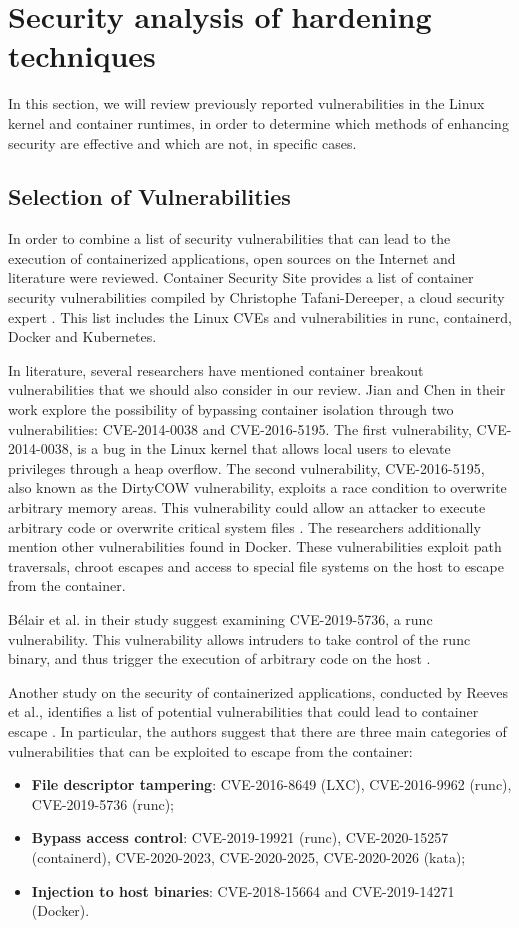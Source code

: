 \section{Security analysis of hardening techniques}

In this section, we will review previously reported vulnerabilities in the Linux kernel and container runtimes, in order to determine which methods of enhancing security are effective and which are not, in specific cases.

\subsection{Selection of Vulnerabilities}
In order to combine a list of security vulnerabilities that can lead to the execution of containerized applications, open sources on the Internet and literature were reviewed. Container Security Site provides a list of container security vulnerabilities compiled by Christophe Tafani-Dereeper, a cloud security expert \cite{s:christoph1}. This list includes the Linux CVEs and vulnerabilities in runc, containerd, Docker and Kubernetes. 

In literature, several researchers have mentioned container breakout vulnerabilities that we should also consider in our review. Jian and Chen in their work explore the possibility of bypassing container isolation through two vulnerabilities: CVE-2014-0038 and CVE-2016-5195. The first vulnerability, CVE-2014-0038, is a bug in the Linux kernel that allows local users to elevate privileges through a heap overflow. The second vulnerability, CVE-2016-5195, also known as the DirtyCOW vulnerability, exploits a race condition to overwrite arbitrary memory areas. This vulnerability could allow an attacker to execute arbitrary code or overwrite critical system files \cite{acm:5}. The researchers additionally mention other vulnerabilities found in Docker. These vulnerabilities exploit path traversals, chroot escapes and access to special file systems on the host to escape from the container. 

Bélair et al. in their study suggest examining CVE-2019-5736, a runc vulnerability. This vulnerability allows intruders to take control of the runc binary, and thus trigger the execution of arbitrary code on the host \cite{acm:6}.

Another study on the security of containerized applications, conducted by Reeves et al., identifies a list of potential vulnerabilities that could lead to container escape \cite{c:19}. In particular, the authors suggest that there are three main categories of vulnerabilities that can be exploited to escape from the container:
\begin{itemize}
    \item \textbf{File descriptor tampering}: CVE-2016-8649 (LXC), CVE-2016-9962 (runc), CVE-2019-5736 (runc);
    \item \textbf{Bypass access control}: CVE-2019-19921 (runc), CVE-2020-15257 (containerd), CVE-2020-2023, CVE-2020-2025, CVE-2020-2026 (kata);
    \item \textbf{Injection to host binaries}: CVE-2018-15664 and CVE-2019-14271 (Docker).
\end{itemize}

